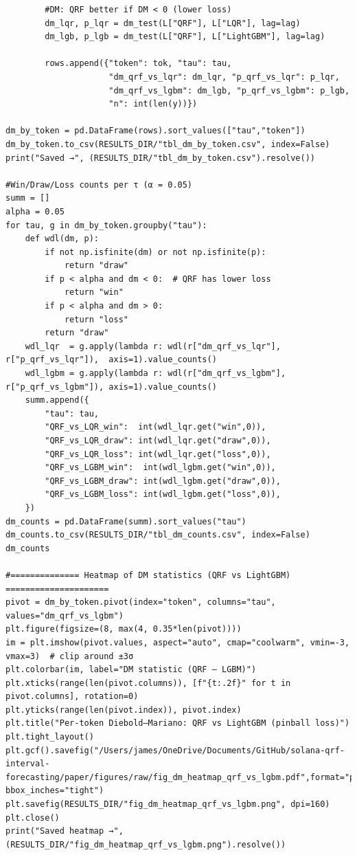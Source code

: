 \documentclass[
  a4paper,
  DIV=11,
  numbers=noendperiod]{scrreprt}
\begin{document}
\begin{verbatim}
        #DM: QRF better if DM < 0 (lower loss)
        dm_lqr, p_lqr = dm_test(L["QRF"], L["LQR"], lag=lag)
        dm_lgb, p_lgb = dm_test(L["QRF"], L["LightGBM"], lag=lag)

        rows.append({"token": tok, "tau": tau,
                     "dm_qrf_vs_lqr": dm_lqr, "p_qrf_vs_lqr": p_lqr,
                     "dm_qrf_vs_lgbm": dm_lgb, "p_qrf_vs_lgbm": p_lgb,
                     "n": int(len(y))})

dm_by_token = pd.DataFrame(rows).sort_values(["tau","token"])
dm_by_token.to_csv(RESULTS_DIR/"tbl_dm_by_token.csv", index=False)
print("Saved →", (RESULTS_DIR/"tbl_dm_by_token.csv").resolve())

#Win/Draw/Loss counts per τ (α = 0.05)
summ = []
alpha = 0.05
for tau, g in dm_by_token.groupby("tau"):
    def wdl(dm, p):
        if not np.isfinite(dm) or not np.isfinite(p):
            return "draw"
        if p < alpha and dm < 0:  # QRF has lower loss
            return "win"
        if p < alpha and dm > 0:
            return "loss"
        return "draw"
    wdl_lqr  = g.apply(lambda r: wdl(r["dm_qrf_vs_lqr"],  r["p_qrf_vs_lqr"]),  axis=1).value_counts()
    wdl_lgbm = g.apply(lambda r: wdl(r["dm_qrf_vs_lgbm"], r["p_qrf_vs_lgbm"]), axis=1).value_counts()
    summ.append({
        "tau": tau,
        "QRF_vs_LQR_win":  int(wdl_lqr.get("win",0)),
        "QRF_vs_LQR_draw": int(wdl_lqr.get("draw",0)),
        "QRF_vs_LQR_loss": int(wdl_lqr.get("loss",0)),
        "QRF_vs_LGBM_win":  int(wdl_lgbm.get("win",0)),
        "QRF_vs_LGBM_draw": int(wdl_lgbm.get("draw",0)),
        "QRF_vs_LGBM_loss": int(wdl_lgbm.get("loss",0)),
    })
dm_counts = pd.DataFrame(summ).sort_values("tau")
dm_counts.to_csv(RESULTS_DIR/"tbl_dm_counts.csv", index=False)
dm_counts

#============== Heatmap of DM statistics (QRF vs LightGBM) =====================
pivot = dm_by_token.pivot(index="token", columns="tau", values="dm_qrf_vs_lgbm")
plt.figure(figsize=(8, max(4, 0.35*len(pivot))))
im = plt.imshow(pivot.values, aspect="auto", cmap="coolwarm", vmin=-3, vmax=3)  # clip around ±3σ
plt.colorbar(im, label="DM statistic (QRF – LGBM)")
plt.xticks(range(len(pivot.columns)), [f"{t:.2f}" for t in pivot.columns], rotation=0)
plt.yticks(range(len(pivot.index)), pivot.index)
plt.title("Per-token Diebold–Mariano: QRF vs LightGBM (pinball loss)")
plt.tight_layout()
plt.gcf().savefig("/Users/james/OneDrive/Documents/GitHub/solana-qrf-interval-forecasting/paper/figures/raw/fig_dm_heatmap_qrf_vs_lgbm.pdf",format="pdf", bbox_inches="tight")
plt.savefig(RESULTS_DIR/"fig_dm_heatmap_qrf_vs_lgbm.png", dpi=160)
plt.close()
print("Saved heatmap →", (RESULTS_DIR/"fig_dm_heatmap_qrf_vs_lgbm.png").resolve())
\end{verbatim}
\end{document}
